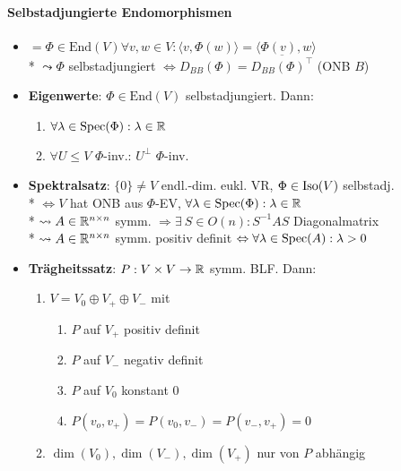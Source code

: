 \paragraph{Selbstadjungierte Endomorphismen}
\begin{itemize}
	\item \( = \Phi \in \text{End}(V) \forall v,w \in V: \langle v, \Phi(w) \rangle = \langle \Phi(v),w \rangle \)
		\\*
		\( \leadsto \Phi \) selbstadjungiert \( \Leftrightarrow D_{BB}(\Phi) = \overline{D_{BB}(\Phi)^\top } \) (ONB \( B \))
	\item \textbf{Eigenwerte}: \( \Phi \in \text{End}(V) \) selbstadjungiert. Dann:
		\begin{enumerate}
			\item \( \forall \lambda \in \text{Spec}(\Phi): \lambda \in \mathbb{R} \) 
			\item \( \forall U \leq V \) \( \Phi \)-inv.: \( U^\perp \) \( \Phi \)-inv.
		\end{enumerate}
	\item \textbf{Spektralsatz}: \( \{ 0 \} \neq V \) endl.-dim. eukl. VR, \( \Phi \in \text{Iso}(V) \) selbstadj.
		\\*
		\( \Leftrightarrow V \) hat ONB aus \( \Phi \)-EV, \( \forall \lambda \in \text{Spec}(\Phi): \lambda \in \mathbb{R} \)
		\\*
		\( \leadsto A \in \mathbb{R}^{n \times n} \) symm. \( \Rightarrow \exists \ S \in O(n): S^{-1}AS \) Diagonalmatrix
		\\*
		\( \leadsto A \in \mathbb{R}^{n \times n} \) symm. positiv definit \( \Leftrightarrow \forall \lambda \in \text{Spec}(A): \lambda > 0 \)
	\item \textbf{Trägheitssatz}: \( P: V \times V \to \mathbb{R} \) symm. BLF. Dann:
		\begin{enumerate}
			\item \( V = V_0 \oplus V_+ \oplus V_-  \) mit
			\begin{enumerate}
				\item \( P \) auf \( V_+ \) positiv definit
				\item \( P \) auf \( V_- \) negativ definit
				\item \( P \) auf \( V_0 \) konstant \( 0 \)
				\item \( P(v_o, v_+) = P(v_0,v_-)=P(v_-,v_+)=0 \)
			\end{enumerate}
			\item \( \dim(V_0), \dim(V_-), \dim(V_+) \) nur von \( P \) abhängig
		\end{enumerate}
\end{itemize}

